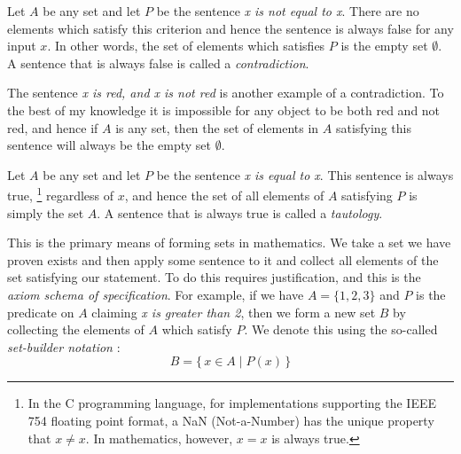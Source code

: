        \begin{example}
            Let $A$ be any set and let $P$ be the sentence
            \textit{x is not equal to x}. There are no elements which satisfy
            this criterion and hence the sentence is always false for any input
            $x$. In other words, the set of elements which satisfies $P$ is the
            empty set $\emptyset$. A sentence that is always false is called a
            \textit{contradiction}.
        \end{example}
        \begin{example}
            The sentence \textit{x is red, and x is not red} is another example
            of a contradiction. To the best of my knowledge it is impossible
            for any object to be both red and not red, and hence if $A$ is any
            set, then the set of elements in $A$ satisfying this sentence will
            always be the empty set $\emptyset$.
        \end{example}
        \begin{example}
            Let $A$ be any set and let $P$ be the sentence
            \textit{x is equal to x}. This sentence is always true,%
            \footnote{
                In the C programming language, for implementations supporting
                the IEEE 754 floating point format, a NaN (Not-a-Number) has
                the unique property that $x\ne{x}$. In mathematics, however,
                $x=x$ is always true.
            }
            regardless
            of $x$, and hence the set of all elements of $A$ satisfying $P$ is
            simply the set $A$. A sentence that is always true is called a
            \textit{tautology}.
        \end{example}
        This is the primary means of forming sets in mathematics. We take a set
        we have proven exists and then apply some sentence to it and collect all
        elements of the set satisfying our statement. To do this requires
        justification, and this is the \textit{axiom schema of specification}.
        For example, if we have $A=\{1,2,3\}$ and $P$ is the predicate on $A$
        claiming \textit{x is greater than 2}, then we form a new set $B$ by
        collecting the elements of $A$ which satisfy $P$. We denote this using
        the so-called \textit{set-builder notation}%
        :
        \begin{equation}
            B=\{\,x\in{A}\;|\;P(x)\,\}
        \end{equation}
